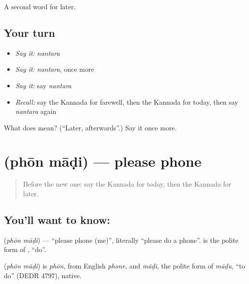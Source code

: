 \begin{grammarlens}[title={What you've built}]
A second word for later.
\end{grammarlens}

\subsection*{Your turn}
\begin{itemize}
\raggedright
  \item \emph{Say it:} \emph{nantara}
  \item \emph{Say it:} \emph{nantara}, once more
  \item \emph{Say it:} say \emph{nantara}
  \item \emph{Recall:} say the Kannada for farewell, then the Kannada for today, then say \emph{nantara} again
\end{itemize}

\begin{tcolorbox}[breakable,colback=teal!4,colframe=teal!35!black,title={Before you move on}]
What does  mean? (\textquotedblleft{}Later, afterwards\textquotedblright{}.) Say it once more.
\end{tcolorbox}
\section[\texorpdfstring{\kn{ಫೋನ್} \kn{ಮಾಡಿ} (phōn māḍi)}{ಫೋನ್ ಮಾಡಿ (phōn māḍi)}]{  (phōn māḍi) — please phone}

\label{lesson:KA-C106-phone}



\begin{quote}
Before the new one: say the Kannada for today, then the Kannada for later.
\end{quote}

\subsection*{You'll want to know:  }
\textbf{ } (\emph{phōn māḍi}) — \textquotedblleft{}please phone (me)\textquotedblright{}, literally \textquotedblleft{}please do a phone\textquotedblright{}. \textbf{} is the polite form of \textbf{}, \textquotedblleft{}do\textquotedblright{}.

\begin{cousinweb}
\textbf{ } (\emph{phōn māḍi}) is \emph{phōn}, from English \emph{phone}, and \emph{māḍi}, the polite form of \emph{māḍu}, \textquotedblleft{}to do\textquotedblright{} (DEDR 4797), native.
\end{cousinweb}

